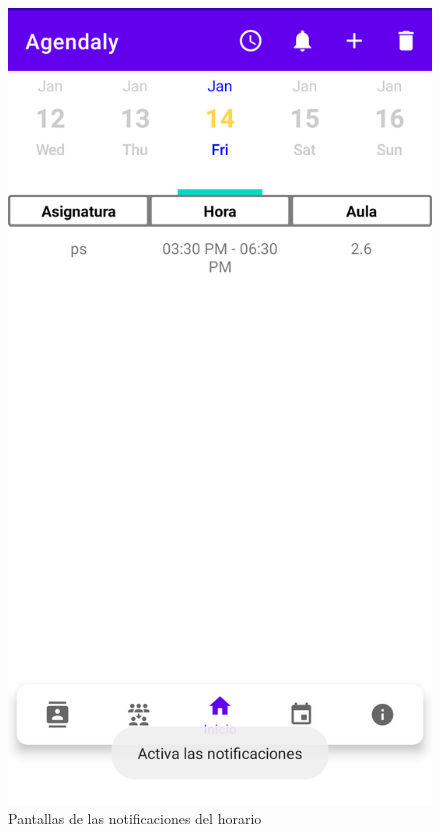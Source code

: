 \documentclass[a4paper,openright,12pt]{article}
\begin{document}
\begin{figure}
        \includegraphics[scale=0.05]{notificacion7.png} 
            \caption{Pantallas de las notificaciones del horario}
        \end{figure}
\end{document}
